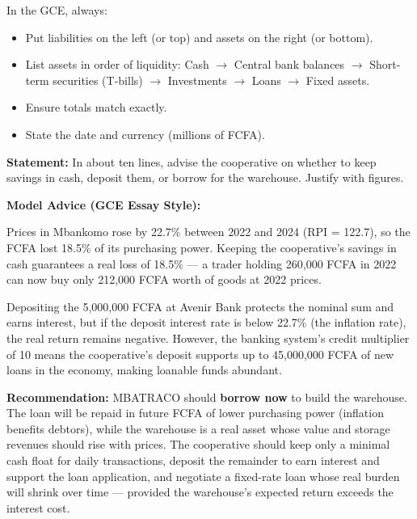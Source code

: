 \documentclass[11pt]{article}
\begin{document}
\begin{exoresolu}
\begin{attention}
In the GCE, always:
\begin{itemize}
\item Put liabilities on the left (or top) and assets on the right (or bottom).
\item List assets in order of liquidity: Cash $\to$ Central bank balances $\to$ Short-term securities (T-bills) $\to$ Investments $\to$ Loans $\to$ Fixed assets.
\item Ensure totals match exactly.
\item State the date and currency (millions of FCFA).
\end{itemize}
\end{attention}
\end{exoresolu}

\begin{exoresolu}
\textbf{Statement:} In about ten lines, advise the cooperative on whether to keep savings in cash, deposit them, or borrow for the warehouse. Justify with figures.

\tcblower
\textbf{Model Advice (GCE Essay Style):}

Prices in Mbankomo rose by 22.7\% between 2022 and 2024 (RPI = 122.7), so the FCFA lost 18.5\% of its purchasing power. Keeping the cooperative's savings in cash guarantees a real loss of 18.5\% — a trader holding 260,000 FCFA in 2022 can now buy only 212,000 FCFA worth of goods at 2022 prices.

Depositing the 5,000,000 FCFA at Avenir Bank protects the nominal sum and earns interest, but if the deposit interest rate is below 22.7\% (the inflation rate), the real return remains negative. However, the banking system's credit multiplier of 10 means the cooperative's deposit supports up to 45,000,000 FCFA of new loans in the economy, making loanable funds abundant.

\textbf{Recommendation:} MBATRACO should \textbf{borrow now} to build the warehouse. The loan will be repaid in future FCFA of lower purchasing power (inflation benefits debtors), while the warehouse is a real asset whose value and storage revenues should rise with prices. The cooperative should keep only a minimal cash float for daily transactions, deposit the remainder to earn interest and support the loan application, and negotiate a fixed-rate loan whose real burden will shrink over time — provided the warehouse's expected return exceeds the interest cost.


\end{exoresolu}
\end{document}
